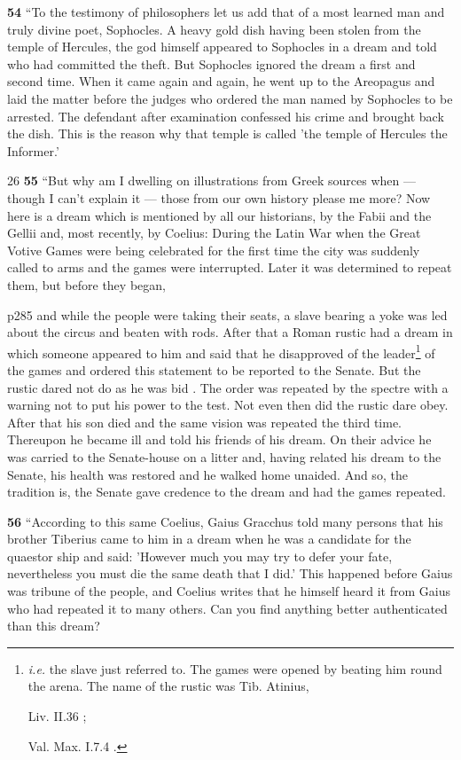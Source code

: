 \textbf{54} ``To the testimony of philosophers let us add that of a most learned man and truly divine poet, Sophocles. A heavy gold dish having been stolen from the temple of Hercules, the god himself appeared to Sophocles in a dream and told who had committed the theft. But Sophocles ignored the dream a first and second time. When it came again and again, he went up to the Areopagus and laid the matter before the judges who ordered the man named by Sophocles to be arrested. The defendant after examination confessed his crime and brought back the dish. This is the reason why that temple is called 'the temple of Hercules the Informer.'

26
\textbf{55} ``But why am I dwelling on illustrations from Greek sources when \texthebrew{—} though I can't explain it \texthebrew{—} those from our own history please me more? Now here is a dream which is mentioned by all our historians, by the Fabii and the Gellii and, most recently, by Coelius: During the Latin War when the Great Votive Games were being celebrated for the first time the city was suddenly called to arms and the games were interrupted. Later it was determined to repeat them, but before they began,

p285 and while the people were taking their seats, a slave bearing a yoke was led about the circus and beaten with rods. After that a Roman rustic had a dream in which someone appeared to him and said that he disapproved of the leader\texthebrew{}\footnote{\emph{i.e.} the slave just referred to. The games were opened by beating him round the arena. The name of the rustic was Tib. Atinius,

Liv. II.36 ;

Val. Max. I.7.4 .

} of the games and ordered this statement to be reported to the Senate. But the rustic dared not do as he was bid . The order was repeated by the spectre with a warning not to put his power to the test. Not even then did the rustic dare obey. After that his son died and the same vision was repeated the third time. Thereupon he became ill and told his friends of his dream. On their advice he was carried to the Senate-house on a litter and, having related his dream to the Senate, his health was restored and he walked home unaided. And so, the tradition is, the Senate gave credence to the dream and had the games repeated.

\textbf{56} ``According to this same Coelius, Gaius Gracchus told many persons that his brother Tiberius came to him in a dream when he was a candidate for the quaestor ­ship and said: 'However much you may try to defer your fate, nevertheless you must die the same death that I did.' This happened before Gaius was tribune of the people, and Coelius writes that he himself heard it from Gaius who had repeated it to many others. Can you find anything better authenticated than this dream?

